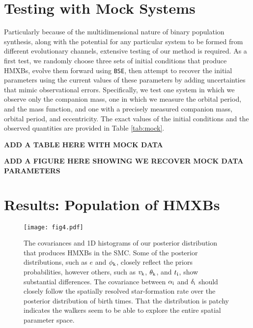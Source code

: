 \documentclass[usenatbib]{mnras}
\newcommand{\bse}{{\tt BSE}}
\begin{document}
\section{Testing with Mock Systems}
\label{sec:mock}

Particularly because of the multidimensional nature of binary population synthesis, along with the potential for any particular system to be formed from different evolutionary channels, extensive testing of our method is required. As a first test, we randomly choose three sets of initial conditions that produce HMXBs, evolve them forward using \bse, then attempt to recover the initial parameters using the current values of these parameters by adding uncertainties that mimic observational errors. Specifically, we test one system in which we observe only the companion mass, one in which we measure the orbital period, and the mass function, and one with a precisely measured companion mass, orbital period, and eccentricity. The exact values of the initial conditions and the observed quantities are provided in Table \ref{tab:mock}.



{\bf ADD A TABLE HERE WITH MOCK DATA}

{\bf ADD A FIGURE HERE SHOWING WE RECOVER MOCK DATA PARAMETERS}








\section{Results: Population of HMXBs} \label{sec:results_population}


\begin{figure*}
\begin{center}
\texttt{[image: fig4.pdf]}
\caption{ The covariances and 1D histograms of our posterior distribution that produces HMXBs in the SMC. Some of the posterior distributions, such as $e$ and $\phi_{\rm k}$, closely reflect the priors probabilities, however others, such as $v_{\rm k}$, $\theta_{\rm k}$, and $t_{\rm i}$, show substantial differences. The covariance between $\alpha_{\rm i}$ and $\delta_{\rm i}$ should closely follow the spatially resolved star-formation rate over the posterior distribution of birth times. That the distribution is patchy indicates the walkers seem to be able to explore the entire spatial parameter space. }
\label{fig:population_corner}
\end{center}
\end{figure*}
\end{document}
